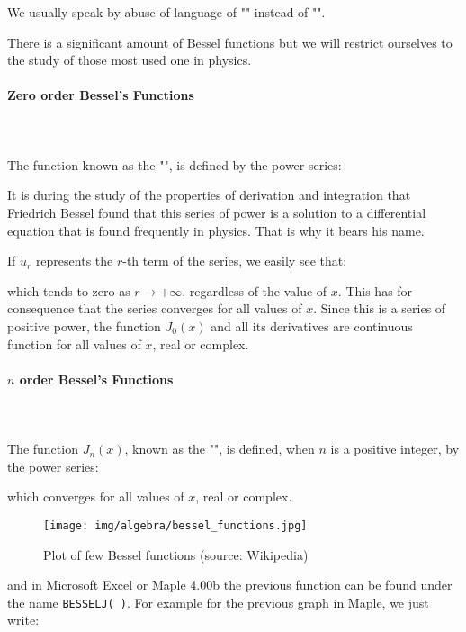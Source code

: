	\begin{tcolorbox}[title=Remark,colframe=black,arc=10pt]
	We usually speak by abuse of language of "\label{bessel functions}" instead of "".
	\end{tcolorbox}
	There is a significant amount of Bessel functions but we will restrict ourselves to the study of those most used one in physics.
	
	\paragraph{Zero order Bessel's Functions}\mbox{}\\\\
	The function known as the "", is defined by the power series:
	
	It is during the study of the properties of derivation and integration that Friedrich Bessel found that this series of power is a solution to a differential equation that is found frequently in physics. That is why it bears his name.
	
	If $u_r$ represents the $r$-th term of the series, we easily see that:
	
	which tends to zero as $r\rightarrow +\infty$, regardless of the value of $x$. This has for consequence that the series converges for all values of $x$. Since this is a series of positive power, the function $J_0(x)$ and all its derivatives are continuous function for all values of $x$, real or complex.
	
	\paragraph{$n$ order Bessel's Functions}\mbox{}\\\\
	The function $J_n(x)$, known as the "", is defined, when $n$ is a positive integer, by the power series:
	
	which converges for all values of $x$, real or complex.
	\begin{figure}[H]
		\centering
		\texttt{[image: img/algebra/bessel\_functions.jpg]}
		\caption[Plot of few Bessel functions]{Plot of few Bessel functions (source: Wikipedia)}
	\end{figure}
	and in Microsoft Excel or Maple 4.00b the previous function can be found under the name \texttt{BESSELJ( )}. For example for the previous graph in Maple, we just write:
	
